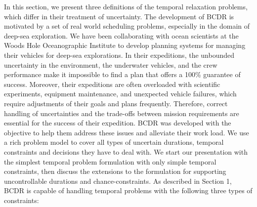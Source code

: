 \documentclass[jair,twoside,11pt,theapa]{article}
\begin{document}
In this section, we present three definitions of the temporal relaxation
problems, which differ in their treatment of uncertainty. The development of
BCDR is motivated by a set of real world scheduling problems, especially in the
domain of deep-sea exploration. We have been collaborating with ocean scientists
at the Woods Hole Oceanographic Institute to develop planning systems for
managing their vehicles for deep-sea explorations. In their expeditions, the
unbounded uncertainty in the environment, the underwater vehicles, and the crew
performance make it impossible to find a plan that offers a 100\% guarantee of
success. Moreover, their expeditions are often overloaded with scientific
experiments, equipment maintenance, and unexpected vehicle failures, which
require adjustments of their goals and plans frequently. Therefore, correct
handling of uncertainties and the trade-offs between mission requirements are
essential for the success of their expedition. BCDR was developed with the
objective to help them address these issues and alleviate their work load. We
use a rich problem model to cover all types of uncertain durations, temporal
constraints and decisions they have to deal with. We start our presentation with
the simplest temporal problem formulation with only simple temporal constraints,
then discuss the extensions to the formulation for supporting uncontrollable
durations and chance-constraints. As described in Section 1, BCDR is capable of
handling temporal problems with the following three types of constraints:
\end{document}
